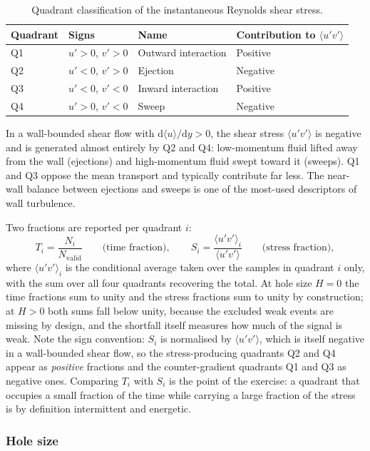 \begin{table}[htbp]
\centering
\caption{Quadrant classification of the instantaneous Reynolds shear stress.}
\begin{tabular}{llll}
\toprule
\textbf{Quadrant} & \textbf{Signs} & \textbf{Name} & \textbf{Contribution to $\langle u'v' \rangle$} \\
\midrule
Q1 & $u' > 0$, $v' > 0$ & Outward interaction & Positive \\
Q2 & $u' < 0$, $v' > 0$ & Ejection            & Negative \\
Q3 & $u' < 0$, $v' < 0$ & Inward interaction  & Positive \\
Q4 & $u' > 0$, $v' < 0$ & Sweep               & Negative \\
\bottomrule
\end{tabular}
\end{table}

In a wall-bounded shear flow with $\mathrm{d}\langle u \rangle/\mathrm{d}y > 0$, the shear stress $\langle u'v' \rangle$ is negative and is generated almost entirely by Q2 and Q4: low-momentum fluid lifted away from the wall (ejections) and high-momentum fluid swept toward it (sweeps). Q1 and Q3 oppose the mean transport and typically contribute far less. The near-wall balance between ejections and sweeps is one of the most-used descriptors of wall turbulence.

Two fractions are reported per quadrant $i$:
\[
T_i = \frac{N_i}{N_{\mathrm{valid}}}
\qquad\text{(time fraction)},
\qquad
S_i = \frac{\langle u'v' \rangle_i}{\langle u'v' \rangle}
\qquad\text{(stress fraction)},
\]
where $\langle u'v' \rangle_i$ is the conditional average taken over the samples in quadrant $i$ only, with the sum over all four quadrants recovering the total. At hole size $H = 0$ the time fractions sum to unity and the stress fractions sum to unity by construction; at $H > 0$ both sums fall below unity, because the excluded weak events are missing by design, and the shortfall itself measures how much of the signal is weak. Note the sign convention: $S_i$ is normalised by $\langle u'v' \rangle$, which is itself negative in a wall-bounded shear flow, so the stress-producing quadrants Q2 and Q4 appear as \emph{positive} fractions and the counter-gradient quadrants Q1 and Q3 as negative ones. Comparing $T_i$ with $S_i$ is the point of the exercise: a quadrant that occupies a small fraction of the time while carrying a large fraction of the stress is by definition intermittent and energetic.

\subsubsection*{Hole size}

